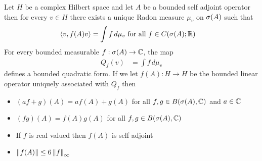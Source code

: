 \begin{thm}\label{hilbert:BoundedMeasurableFunctionalCalculusBoundedSelfAdjoint}Let $H$ be a complex Hilbert space and let $A$ be a bounded self adjoint operator then for every $v \in H$ there exists a unique Radon measure $\mu_v$ on $\sigma(A)$ such that 
\begin{align*}
\langle v, f(A) v \rangle &= \int f \, d\mu_v \text{ for all $f \in C(\sigma(A); \mathbb{R})$}
\end{align*}
For every bounded measurable $f : \sigma(A) \to \mathbb{C}$, the map 
\begin{align*}
Q_f(v) &= \int f \, d\mu_v
\end{align*}
defines a bounded quadratic form.  If we let $f(A) : H \to H$ be the bounded linear operator uniquely associated with $Q_f$ then  
\begin{itemize}
\item[(i)] $(af + g)(A) = af(A) + g(A)$ for all $f,g \in B(\sigma(A), \mathbb{C})$ and $a \in \mathbb{C}$
\item[(ii)] $(fg)(A) = f(A) g(A)$ for all $f,g \in B(\sigma(A), \mathbb{C})$
\item[(iii)] If $f$ is real valued then $f(A)$ is self adjoint
\item[(iv)] $\left \lVert f(A) \right \rVert \leq 6 \left \lVert f \right \rVert_\infty$
\end{itemize}
\end{thm}
